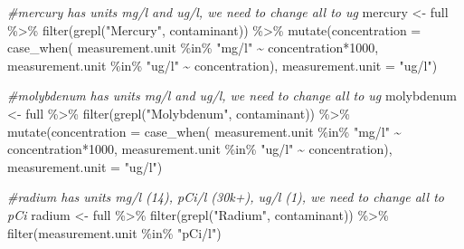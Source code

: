 \documentclass[12pt, twoside]{amherstthesis}
\newenvironment{Shaded}{\begin{snugshade}}{\end{snugshade}}
\newcommand{\AttributeTok}[1]{\textcolor[rgb]{0.77,0.63,0.00}{#1}}
\newcommand{\CommentTok}[1]{\textcolor[rgb]{0.56,0.35,0.01}{\textit{#1}}}
\newcommand{\DecValTok}[1]{\textcolor[rgb]{0.00,0.00,0.81}{#1}}
\newcommand{\FunctionTok}[1]{\textcolor[rgb]{0.00,0.00,0.00}{#1}}
\newcommand{\NormalTok}[1]{#1}
\newcommand{\OtherTok}[1]{\textcolor[rgb]{0.56,0.35,0.01}{#1}}
\newcommand{\SpecialCharTok}[1]{\textcolor[rgb]{0.00,0.00,0.00}{#1}}
\newcommand{\StringTok}[1]{\textcolor[rgb]{0.31,0.60,0.02}{#1}}
\begin{document}
\begin{Shaded}
\begin{Highlighting}[]
\CommentTok{\#mercury has units mg/l and ug/l, we need to change all to ug}
\NormalTok{mercury }\OtherTok{\textless{}{-}}\NormalTok{ full }\SpecialCharTok{\%\textgreater{}\%}
  \FunctionTok{filter}\NormalTok{(}\FunctionTok{grepl}\NormalTok{(}\StringTok{"Mercury"}\NormalTok{, contaminant)) }\SpecialCharTok{\%\textgreater{}\%}
  \FunctionTok{mutate}\NormalTok{(}\AttributeTok{concentration =} 
           \FunctionTok{case\_when}\NormalTok{(}
\NormalTok{             measurement.unit }\SpecialCharTok{\%in\%} \StringTok{"mg/l"} \SpecialCharTok{\textasciitilde{}}\NormalTok{ concentration}\SpecialCharTok{*}\DecValTok{1000}\NormalTok{,}
\NormalTok{             measurement.unit }\SpecialCharTok{\%in\%} \StringTok{"ug/l"} \SpecialCharTok{\textasciitilde{}}\NormalTok{ concentration),}
         \AttributeTok{measurement.unit =} \StringTok{"ug/l"}\NormalTok{)}


\CommentTok{\#molybdenum has units mg/l and ug/l, we need to change all to ug}
\NormalTok{molybdenum }\OtherTok{\textless{}{-}}\NormalTok{ full }\SpecialCharTok{\%\textgreater{}\%}
  \FunctionTok{filter}\NormalTok{(}\FunctionTok{grepl}\NormalTok{(}\StringTok{"Molybdenum"}\NormalTok{, contaminant)) }\SpecialCharTok{\%\textgreater{}\%}
  \FunctionTok{mutate}\NormalTok{(}\AttributeTok{concentration =} 
           \FunctionTok{case\_when}\NormalTok{(}
\NormalTok{             measurement.unit }\SpecialCharTok{\%in\%} \StringTok{"mg/l"} \SpecialCharTok{\textasciitilde{}}\NormalTok{ concentration}\SpecialCharTok{*}\DecValTok{1000}\NormalTok{,}
\NormalTok{             measurement.unit }\SpecialCharTok{\%in\%} \StringTok{"ug/l"} \SpecialCharTok{\textasciitilde{}}\NormalTok{ concentration),}
         \AttributeTok{measurement.unit =} \StringTok{"ug/l"}\NormalTok{)}


\CommentTok{\#radium has units mg/l (14), pCi/l (30k+), ug/l (1), we need to change all to pCi}
\NormalTok{radium }\OtherTok{\textless{}{-}}\NormalTok{ full }\SpecialCharTok{\%\textgreater{}\%}
  \FunctionTok{filter}\NormalTok{(}\FunctionTok{grepl}\NormalTok{(}\StringTok{"Radium"}\NormalTok{, contaminant)) }\SpecialCharTok{\%\textgreater{}\%}
  \FunctionTok{filter}\NormalTok{(measurement.unit }\SpecialCharTok{\%in\%} \StringTok{"pCi/l"}\NormalTok{)}


\end{Highlighting}
\end{Shaded}
\end{document}
